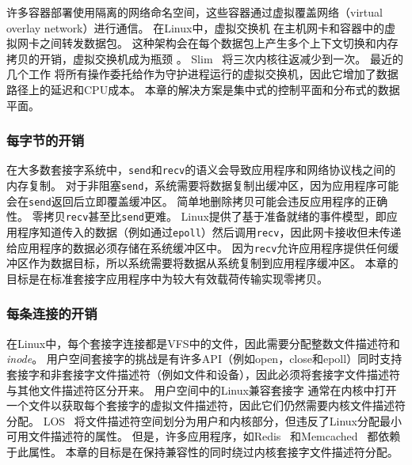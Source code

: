 许多容器部署使用隔离的网络命名空间，这些容器通过虚拟覆盖网络（virtual overlay network）进行通信。
在Linux中，虚拟交换机 \cite {pfaff2015design} 在主机网卡和容器中的虚拟网卡之间转发数据包。
这种架构会在每个数据包上产生多个上下文切换和内存拷贝的开销，虚拟交换机成为瓶颈 \cite {pfefferle2015hybrid}。
Slim~ \cite {slim} 将三次内核往返减少到一次。
最近的几个工作 \cite {martins2014clickos,roghanchi2017ffwd,huang2017high,nsdi19freeflow} 将所有操作委托给作为守护进程运行的虚拟交换机，因此它增加了数据路径上的延迟和CPU成本。
本章的解决方案是集中式的控制平面和分布式的数据平面。


\subsubsection{每字节的开销}
\label{socksdirect:subsec:per-byte-overhead}

在大多数套接字系统中，\texttt {send}和\texttt {recv}的语义会导致应用程序和网络协议栈之间的内存复制。 对于非阻塞\texttt {send}，系统需要将数据复制出缓冲区，因为应用程序可能会在\texttt {send}返回后立即覆盖缓冲区。 简单地删除拷贝可能会违反应用程序的正确性。
零拷贝\texttt {recv}甚至比\texttt {send}更难。
Linux提供了基于准备就绪的事件模型，即应用程序知道传入的数据（例如通过\texttt {epoll}）然后调用\texttt {recv}，因此网卡接收但未传递给应用程序的数据必须存储在系统缓冲区中。
因为\texttt {recv}允许应用程序提供任何缓冲区作为数据目标，所以系统需要将数据从系统复制到应用程序缓冲区。
本章的目标是在标准套接字应用程序中为较大有效载荷传输实现零拷贝。



\subsubsection{每条连接的开销}
\label{socksdirect:subsec:per-connection-overhead}

在Linux中，每个套接字连接都是VFS中的文件，因此需要分配整数文件描述符和\emph {inode}。
用户空间套接字的挑战是有许多API（例如open，close和epoll）同时支持套接字和非套接字文件描述符（例如文件和设备），因此必须将套接字文件描述符与其他文件描述符区分开来。
用户空间中的Linux兼容套接字 \cite {libvma,rsockets} 通常在内核中打开一个文件以获取每个套接字的虚拟文件描述符，因此它们仍然需要内核文件描述符分配。
LOS~ \cite {huang2017high} 将文件描述符空间划分为用户和内核部分，但违反了Linux分配最小可用文件描述符的属性。
但是，许多应用程序，如Redis~ \cite {redis} 和Memcached~ \cite {memcached} 都依赖于此属性。
本章的目标是在保持兼容性的同时绕过内核套接字文件描述符分配。

